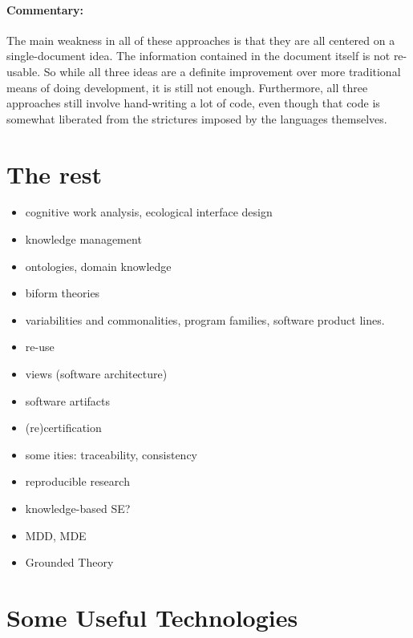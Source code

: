 \documentclass[sigconf,review]{acmart}
\begin{document}
\paragraph{Commentary:} The main weakness in all of these approaches is
that they are all centered on a single-document idea. The information
contained in the document itself is not re-usable. So while all three
ideas are a definite improvement over more traditional means of doing
development, it is still not enough. Furthermore, all three approaches
still involve hand-writing a lot of code, even though that code is
somewhat liberated from the strictures imposed by the languages themselves.

\section{The rest}
\begin{itemize}
\item cognitive work analysis, ecological interface design
\item knowledge management
\item ontologies, domain knowledge
\item biform theories
\item variabilities and commonalities, program families,
software product lines.
\item re-use
\item views (software architecture)
\item software artifacts
\item (re)certification
\item some ities: traceability, consistency
\item reproducible research
\item knowledge-based SE?
\item MDD, MDE
\item Grounded Theory
\end{itemize}

\section{Some Useful Technologies}\label{ch:techniques}

\end{document}
